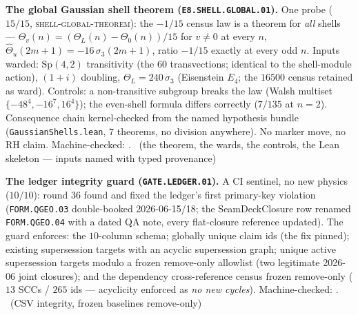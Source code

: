 \par\smallskip\noindent\textbf{The global Gaussian shell theorem
(\texttt{E8.SHELL.GLOBAL.01}).}
One probe ($15/15$, \textsc{shell-global-theorem}): the $-1/15$
census law is a theorem for \emph{all} shells --- $\Theta_v(n) =
(\Theta_L(n) - \Theta_0(n))/15$ for $v \ne 0$ at every $n$,
$\hat\Theta_u(2m{+}1) = -16\,\sigma_3(2m{+}1)$, ratio $-1/15$
exactly at every odd $n$.  Inputs warded: $\mathrm{Sp}(4,2)$
transitivity (the $60$ transvections; identical to the
shell-module action), $(1{+}i)$ doubling, $\Theta_L =
240\,\sigma_3$ (Eisenstein $E_4$; the $16500$ census retained as
ward).  Controls: a non-transitive subgroup breaks the law
(Walsh multiset $\{-48^4, -16^7, 16^4\}$); the even-shell
formula differs correctly ($7/135$ at $n = 2$).  Consequence
chain kernel-checked from the named hypothesis bundle
(\texttt{GaussianShells.lean}, $7$ theorems, no division
anywhere).  No marker move, no RH claim.
Machine-checked: .
\mE\ (the theorem, the wards, the controls, the Lean skeleton
--- inputs named with typed provenance)
\par\smallskip

\par\smallskip\noindent\textbf{The ledger integrity guard
(\texttt{GATE.LEDGER.01}).}
A CI sentinel, no new physics ($10/10$): round 36 found and
fixed the ledger's first primary-key violation
(\texttt{FORM.QGEO.03} double-booked 2026-06-15/18; the
SeamDeckClosure row renamed \texttt{FORM.QGEO.04} with a dated
QA note, every flat-closure reference updated).  The guard
enforces: the $10$-column schema; globally unique claim ids
(the fix pinned); existing supersession targets with an acyclic
supersession graph; unique active supersession targets modulo a
frozen remove-only allowlist (two legitimate 2026-06 joint
closures); and the dependency cross-reference census frozen
remove-only ($13$ SCCs / $265$ ids --- acyclicity enforced as
\emph{no new cycles}).
Machine-checked: .
\mE\ (CSV integrity, frozen baselines remove-only)
\par\smallskip


